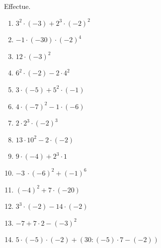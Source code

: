 %
%
    Effectue.
    \begin{enumerate}[itemsep=.4cm, cols=2]
        \item   \(3^{2} \cdot ( - 3) + 2^{3} \cdot ( - 2)^{2} \)
        \item \(- 1 \cdot ( - 30) \cdot ( - 2)^{4} \)
        \item \(12 \cdot ( - 3)^{2} \)
        \item \(6^{2} \cdot ( - 2) - 2 \cdot 4^{2} \)
        \item \(3 \cdot ( - 5) + 5^{2} \cdot ( - 1) \)
        \item \(4 \cdot ( - 7)^{2} - 1 \cdot ( - 6) \)
        \item \(2 \cdot  2^{3} \cdot ( - 2)^{3} \)
        \item \(13 \cdot 10^{2} - 2 \cdot ( - 2) \)
        \item \(9 \cdot ( - 4) + 2^{3} \cdot 1 \)
        \item \(- 3\  \cdot ( - 6)^{2} + ( - 1)^{6} \)
        \item \( ( - 4)^{2} + 7 \cdot ( - 20) \)
        \item \(3^{3} \cdot ( - 2) - 14 \cdot ( - 2) \)
        \item \(-7 + 7 \cdot 2 - (-3)^2\)
        \item \(5 \cdot (-5) \cdot (-2) + \left(30:(-5)\cdot7- (-2)\right)\)
    \end{enumerate}
